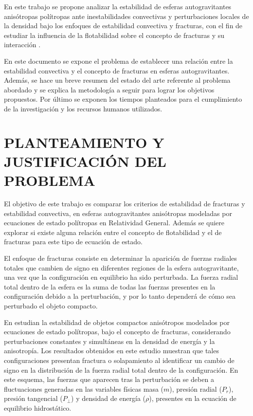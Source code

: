 \documentclass[letterpaper,11pt]{article}
\begin{document}
En este trabajo se propone analizar la estabilidad de esferas autogravitantes anisótropas polítropas ante inestabilidades convectivas y perturbaciones locales de la densidad bajo los enfoques de estabilidad convectiva y fracturas, con el fin de estudiar la influencia de la flotabilidad sobre el concepto de fracturas y su interacción \cite{hernandez2018convection}. 

En este documento se expone el problema de establecer una relación entre la estabilidad convectiva y el concepto de fracturas en esferas autogravitantes. Además, se hace un breve resumen del estado del arte referente al problema abordado y se explica la metodología a seguir para lograr los objetivos propuestos. Por último se exponen los tiempos planteados para el cumplimiento de la investigación y los recursos humanos utilizados.





\section{PLANTEAMIENTO Y JUSTIFICACIÓN DEL PROBLEMA}

El objetivo de este trabajo es comparar los criterios de estabilidad de fracturas y estabilidad convectiva, en esferas autogravitantes anisótropas modeladas por ecuaciones de estado polítropas en Relatividad General. Además se quiere explorar si existe alguna relación entre el concepto de flotabilidad y el de fracturas para este tipo de ecuación de estado.

El enfoque de fracturas \cite{Herrera1992,DiPrisco1994,DiPrisco1997} consiste en determinar la aparición de fuerzas radiales totales que cambien de signo en diferentes regiones de la esfera autogravitante, una vez que la configuración en equilibrio ha sido perturbada. La fuerza radial total dentro de la esfera es la suma de todas las fuerzas presentes en la configuración debido a la perturbación, y por lo tanto dependerá de cómo sea perturbado el objeto compacto.

En \cite{HerreraFuenmayorLeon2016} estudian la estabilidad de objetos compactos anisótropos modelados por ecuaciones de estado polítropas, bajo el concepto de fracturas, considerando perturbaciones constantes y simultáneas en la densidad de energía y la anisotropía. Los resultados obtenidos en este estudio muestran que tales configuraciones presentan fractura o solapamiento al identificar un cambio de signo en la distribución de la fuerza radial total dentro de la configuración. En este esquema, las fuerzas que aparecen tras la perturbación se deben a fluctuaciones generadas en las variables físicas masa ($m$), presión radial ($P_{r}$), presión tangencial ($P_{\perp}$) y densidad de energía ($\rho$), presentes en la ecuación de equilibrio hidrostático.
\end{document}
